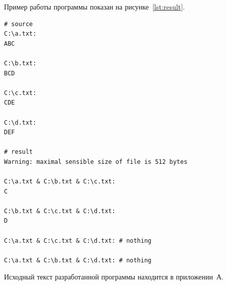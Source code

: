 Пример работы программы показан на рисунке~\ref{lst:result}.

\begin{lstlisting}[caption=Пример работы программы,
label=lst:result,basicstyle=\scriptsize\ttfamily]
# source
C:\a.txt:
ABC

C:\b.txt:
BCD

C:\c.txt:
CDE

C:\d.txt:
DEF

# result
Warning: maximal sensible size of file is 512 bytes

C:\a.txt & C:\b.txt & C:\c.txt:
C

C:\b.txt & C:\c.txt & C:\d.txt:
D

C:\a.txt & C:\c.txt & C:\d.txt: # nothing

C:\a.txt & C:\b.txt & C:\d.txt: # nothing

\end{lstlisting}

Исходный текст разработанной программы находится в приложении~А.
